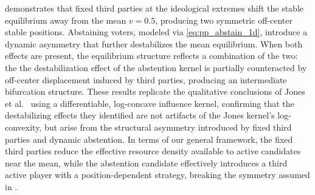 \documentclass{article}
\begin{document}
         demonstrates that fixed third parties at the ideological extremes shift the stable equilibrium away from the mean $v = 0.5$, producing two symmetric off-center stable positions.
        Abstaining voters, modeled via \cref{eq:pp_abstain_1d}, introduce a dynamic asymmetry that further destabilizes the mean equilibrium.
        When both effects are present, the equilibrium structure reflects a combination of the two: the the destabilization effect of the abstention kernel is partially counteracted by off-center displacement induced by third parties, producing an intermediate bifurcation structure.
        These results replicate the qualitative conclusions of Jones et al.\ \cite{jones2022polarization} using a differentiable, log-concave influence kernel, confirming that the destabilizing effects they identified are not artifacts of the Jones kernel's log-convexity, but arise from the structural asymmetry introduced by fixed third parties and dynamic abstention.
        In terms of our general framework, the fixed third parties reduce the effective resource density available to active candidates near the mean, while the abstention candidate effectively introduces a third active player with a position-dependent strategy, breaking the symmetry assumed in .
\end{document}
